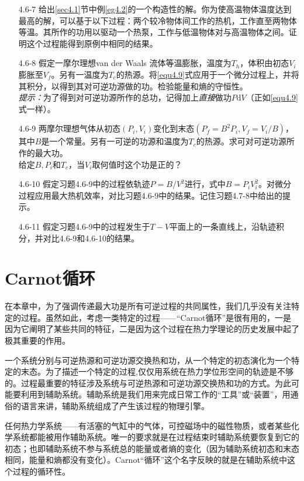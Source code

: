 \begin{itemize}
\item[4.6-7] 给出\ref{sec4.1}节中例\ref{eg4.2}的一个构造性的解。你为使高温物体温度达到最高的解，可以基于以下过程：两个较冷物体间工作的热机，工作直至两物体等温。其所作的功用以驱动一个热泵，工作与低温物体对与高温物体之间。证明这个过程能得到原例中相同的结果。
\item[4.6-8] 假定一摩尔理想van der Waals 流体等温膨胀，温度为$T_h$，体积由初态$V_i$膨胀至$V_f$。另有一温度为$T_c$的热源。将\eqref{equ4.9}式应用于一个微分过程上，并将其积分，以得到其对可逆功源做的功。检验能量和熵的守恒性。\\
{\it 提示：}为了得到对可逆功源所作的总功，记得加上{\it 直接}做功$P\mathrm dV$（正如\eqref{equ4.9}式一样）。
\item[4.6-9] 两摩尔理想气体从初态$(P_i,V_i)$变化到末态$(P_f=B^2P_i,V_f=V_i/B)$，其中$B$是一个常量。另有一可逆的功源和温度为$T_c$的热源。求可对可逆功源所作的最大功。\\
给定$B,P_i$和$T_c$，当$V_i$取何值时这个功是正的？
\item[4.6-10] 假定习题4.6-9中的过程依轨迹$P=B/V^2$进行，式中$B=P_iV_i^2$。对微分过程应用最大热机效率，对比习题4.6-9中的结果。记住习题4.7-8中给出的提示。
\item[4.6-11] 假定习题4.6-9中的过程发生于$T-V$平面上的一条直线上，沿轨迹积分，并对比4.6-9和4.6-10的结果。
\end{itemize}


\section{Carnot循环}
\label{sec4.7}

在本章中，为了强调传递最大功是所有可逆过程的共同属性，我们几乎没有关注特定的过程。虽然如此，考虑一类特定的过程——“Carnot循环”是很有用的，一是因为它阐明了某些共同的特征，二是因为这个过程在热力学理论的历史发展中起了极其重要的作用。

一个系统分别与可逆热源和可逆功源交换热和功，从一个特定的初态演化为一个特定的末态。为了描述一个特定的过程,仅仅用系统在热力学位形空间的轨迹是不够的。过程最重要的特征涉及系统与可逆热源和可逆功源交换热和功的方式。为此可能要利用到辅助系统。辅助系统是我们用来完成日常工作的“工具”或“装置”，用通俗的语言来讲，辅助系统组成了产生该过程的物理引擎。

任何热力学系统——有活塞的气缸中的气体，可控磁场中的磁性物质，或者某些化学系统都能被用作辅助系统。唯一的要求就是在过程结束时辅助系统要恢复到它的初态；也即辅助系统不参与系统总的能量或者熵的变化（因为辅助系统初态和末态相同，能量和熵都没有变化）。Carnot“循环”这个名字反映的就是在辅助系统中这个过程的循环性。

